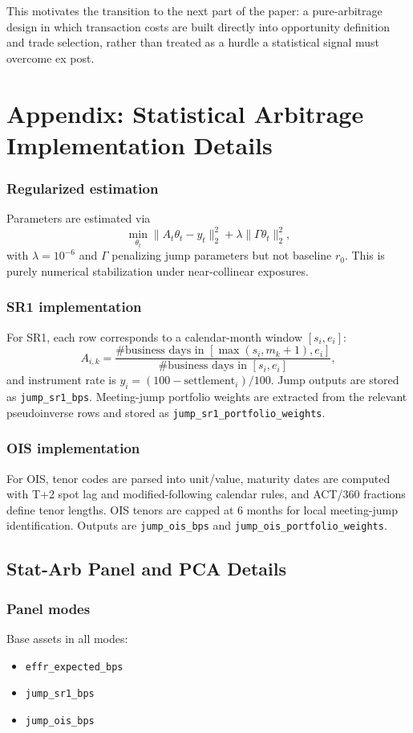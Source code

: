 This motivates the transition to the next part of the paper: a pure-arbitrage design in which transaction costs are built directly into opportunity definition and trade selection, rather than treated as a hurdle a statistical signal must overcome ex post.

\section*{Appendix: Statistical Arbitrage Implementation Details}

\subsubsection*{Regularized estimation}
Parameters are estimated via
\[
\min_{\theta_t}\|A_t\theta_t-y_t\|_2^2 + \lambda\|\Gamma\theta_t\|_2^2,
\]
with $\lambda=10^{-6}$ and $\Gamma$ penalizing jump parameters but not baseline
$r_0$. This is purely numerical stabilization under near-collinear exposures.

\subsubsection*{SR1 implementation}
For SR1, each row corresponds to a calendar-month window $[s_i,e_i]$:
\[
A_{i,k}=\frac{\#\text{business days in }[\max(s_i,m_k+1),e_i]}
{\#\text{business days in }[s_i,e_i]},
\]
and instrument rate is $y_i=(100-\text{settlement}_i)/100$. Jump outputs are
stored as \texttt{jump\_sr1\_bps}. Meeting-jump portfolio weights are extracted
from the relevant pseudoinverse rows and stored as
\texttt{jump\_sr1\_portfolio\_weights}.

\subsubsection*{OIS implementation}
For OIS, tenor codes are parsed into unit/value, maturity dates are computed
with T+2 spot lag and modified-following calendar rules, and ACT/360 fractions
define tenor lengths. OIS tenors are capped at 6 months for local meeting-jump
identification. Outputs are \texttt{jump\_ois\_bps} and
\texttt{jump\_ois\_portfolio\_weights}.

\subsection{Stat-Arb Panel and PCA Details}
\label{app:statarb_panel_pca}

\subsubsection*{Panel modes}
Base assets in all modes:
\begin{itemize}
    \item \texttt{effr\_expected\_bps}
    \item \texttt{jump\_sr1\_bps}
    \item \texttt{jump\_ois\_bps}
\end{itemize}

